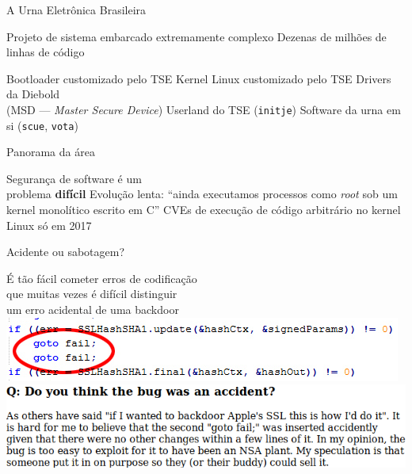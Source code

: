 \documentclass[14pt]{beamer}
\begin{document}
\begin{frame}[plain]
  \vfill
  \color{colorblue}
  \vfill
  \color{gray}{Relatos do Teste Público de Segurança do Sistema Eletrônico de Votação -- 2017}
  \vfill
  \color{orange}{Caio Lüders, Diego Aranha, Paulo Matias, Pedro Barbosa, Thiago Cardoso}
  \vfill
\end{frame}

\begin{frame}{A Urna Eletrônica Brasileira}
  \begin{fullpageitemize}
  \itemR Projeto de sistema embarcado extremamente complexo
  \itemR Dezenas de milhões de linhas de código
    \begin{itemize}
      \itemR Bootloader customizado pelo TSE
      \itemR Kernel Linux customizado pelo TSE
      \itemR Drivers da Diebold\\(MSD --- \textit{Master Secure Device})
      \itemR Userland do TSE (\texttt{initje})
      \itemR Software da urna em si (\texttt{scue}, \texttt{vota})
    \end{itemize}
  \end{fullpageitemize}
\end{frame}

\begin{frame}{Panorama da área}
  \begin{fullpageitemize}
    \itemR Segurança de software é um\\problema \textbf{difícil}
    \itemR Evolução lenta: ``ainda executamos processos como \textit{root} sob um kernel monolítico escrito em C''
     CVEs de execução de código arbitrário no kernel Linux só em 2017
  \end{fullpageitemize}
\end{frame}

\begin{frame}{Acidente ou sabotagem?}
  \begin{fullpageitemize}
    \itemR É tão fácil cometer erros de codificação\\que muitas vezes é difícil distinguir\\um erro acidental de uma backdoor
    \vfill
    \includegraphics[width=\textwidth,height=0.45\textheight,keepaspectratio]{images/gotofail_code}
    \vfill
    \includegraphics[width=\textwidth,height=0.45\textheight,keepaspectratio]{images/gotofail}
  \end{fullpageitemize}
\end{frame}
\end{document}
